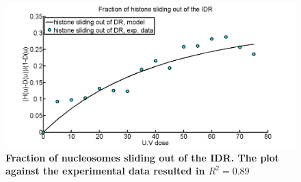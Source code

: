 \documentclass[12pt]{article}
\begin{document}
\begin{figure}[H]
\centering
\includegraphics[width=0.5\linewidth, height=0.3\textheight]{fractionSlidingOutOfIDR}
\caption{\textbf{Fraction of nucleosomes sliding out of the IDR. The plot against the experimental data resulted in $R^2=0.89$ }}
\label{fig:fractionSlidingOutOfIDR}
\end{figure}
\end{document}
